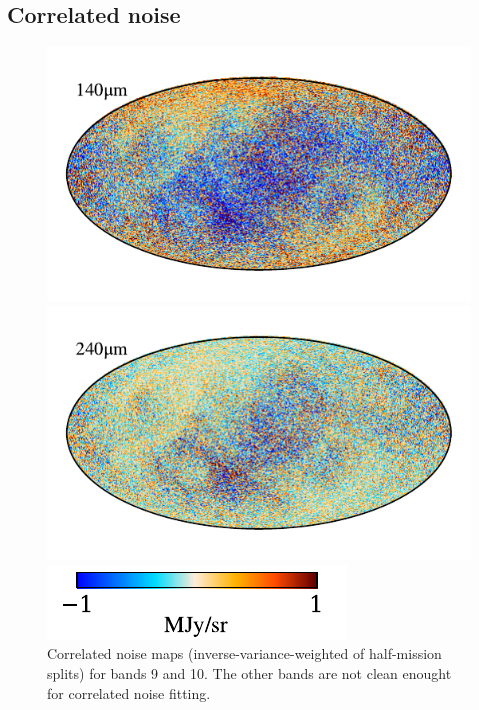 \documentclass{aa}
\begin{document}
\subsection{Correlated noise}
\begin{figure}
	\centering
	\includegraphics{figs/ncorr_09_c0001_000019.pdf}

	\includegraphics{figs/ncorr_10_c0001_000019.pdf}

	\includegraphics[width=0.5\columnwidth]{figs/ncorr_cbar_c0001_000019.pdf}
	\caption{Correlated noise maps (inverse-variance-weighted of half-mission splits) for bands 9 and 10. The other bands are not clean enought for correlated noise fitting.}
	\label{fig:ncorr}
\end{figure}
\end{document}

